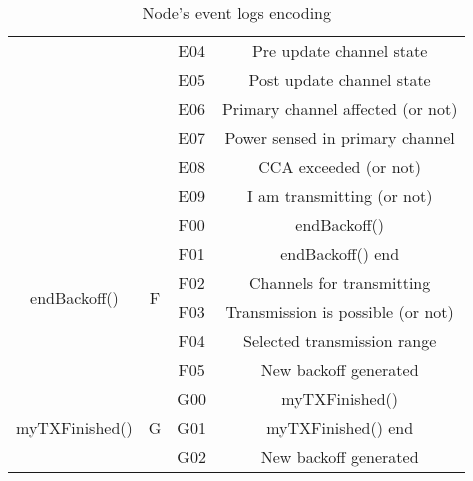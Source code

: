 \documentclass[a4paper]{article}
\begin{document}
\begin{table}[h!]
\begin{tabular}{|c|c|c|c|}
		&                     & E04               & Pre update channel state                                \\ \cline{3-4} 
		&                     & E05               & Post update channel state                               \\ \cline{3-4} 
		&                     & E06               & Primary channel affected (or not)                       \\ \cline{3-4} 
		&                     & E07               & Power sensed in primary channel                         \\ \cline{3-4} 
		&                     & E08               & CCA exceeded (or not)                                   \\ \cline{3-4} 
		&                     & E09               & I am transmitting (or not)                              \\ \hline
		\multirow{6}{*}{endBackoff()}              & \multirow{6}{*}{F}  & F00               & endBackoff()                                            \\ \cline{3-4} 
		&                     & F01               & endBackoff() end                                        \\ \cline{3-4} 
		&                     & F02               & Channels for transmitting                               \\ \cline{3-4} 
		&                     & F03               & Transmission is possible (or not)                       \\ \cline{3-4} 
		&                     & F04               & Selected transmission range                             \\ \cline{3-4} 
		&                     & F05               & New backoff generated                                   \\ \hline
		\multirow{3}{*}{myTXFinished()}            & \multirow{3}{*}{G}  & G00               & myTXFinished()                                          \\ \cline{3-4} 
		&                     & G01               & myTXFinished() end                                      \\ \cline{3-4} 
		&                     & G02               & New backoff generated                                   \\ \hline
	\end{tabular}
	\caption{Node's event logs encoding}
	\label{table:event_coding}
\end{table}
\end{document}

